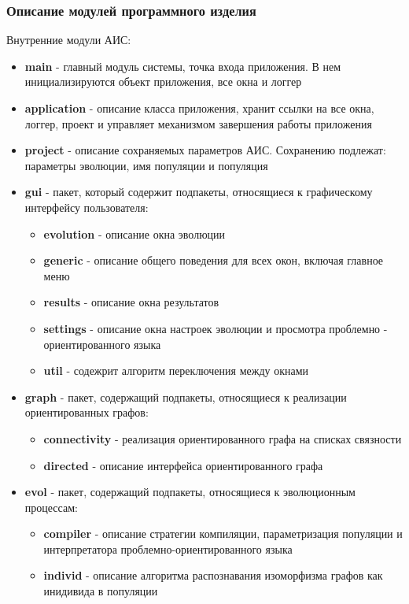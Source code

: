 \documentclass[russian,utf8,emptystyle]{eskdtext}
\begin{document}
\begin{spacing}{1.5}
\subsubsection{Описание модулей программного изделия}
Внутренние модули АИС:
\begin{itemize}
\item \textbf{main} - главный модуль системы, точка входа приложения. В нем инициализируются объект приложения, все окна и логгер
\item \textbf{application} - описание класса приложения, хранит ссылки на все окна, логгер, проект и управляет механизмом завершения работы приложения
\item \textbf{project} - описание сохраняемых параметров АИС. Сохранению подлежат: параметры эволюции, имя популяции и популяция
\item \textbf{gui} - пакет, который содержит подпакеты, относящиеся к графическому интерфейсу пользователя:
\begin{itemize}
\item \textbf{evolution} - описание окна эволюции
\item \textbf{generic} - описание общего поведения для всех окон, включая главное меню
\item \textbf{results} - описание окна результатов
\item \textbf{settings} - описание окна настроек эволюции и просмотра проблемно - ориентированного языка
\item \textbf{util} - содежрит алгоритм переключения между окнами
\end{itemize}
\item \textbf{graph} - пакет, содержащий подпакеты, относящиеся к реализации ориентированных графов:
\begin{itemize}
\item \textbf{connectivity} - реализация ориентированного графа на списках связности
\item \textbf{directed} - описание интерфейса ориентированного графа
\end{itemize}
\item \textbf{evol} - пакет, содержащий подпакеты, относящиеся к эволюционным процессам:
\begin{itemize}
\item \textbf{compiler} - описание стратегии компиляции, параметризация популяции и интерпретатора проблемно-ориентированного языка
\item \textbf{individ} - описание алгоритма распознавания изоморфизма графов как инидивида в популяции

\end{itemize}
\end{itemize}
\end{spacing}
\end{document}
